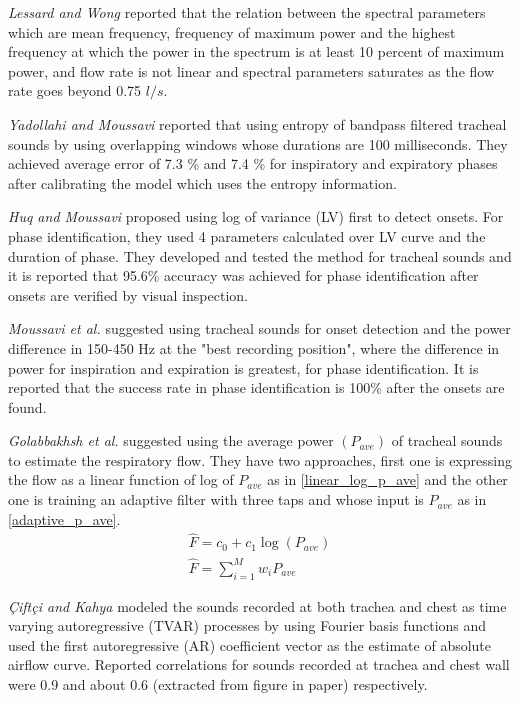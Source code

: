 \textit{Lessard and Wong} \cite{corr-cons-flow-spectrum} reported that the relation between the spectral parameters which are mean frequency, frequency of maximum power and the highest frequency at which the power in the spectrum is at least 10 percent of maximum power, and flow rate is not linear and spectral parameters saturates as the flow rate goes beyond 0.75 $l/s$. \par
\textit{Yadollahi and Moussavi} \cite{entropy-tracheal} reported that using entropy of bandpass filtered tracheal sounds by using overlapping windows whose durations are 100 milliseconds. They achieved average error of 7.3 \% and 7.4 \% for inspiratory and expiratory phases after calibrating the model which uses the entropy information.\par
\textit{Huq and Moussavi} \cite{saiful-moussavi-log-variance} proposed using log of variance (LV) first to detect onsets. For phase identification, they used 4 parameters calculated over LV curve and the duration of phase. They developed and tested the method for tracheal sounds and it is reported that 95.6\% accuracy was achieved for phase identification after onsets are verified by visual inspection.\par
\textit{Moussavi et al.} \cite{computerised-acoustical-phase} suggested using tracheal sounds for onset detection and the power difference in 150-450 Hz at the "best recording position", where the difference in power for inspiration and expiration is greatest, for phase identification. It is reported that the success rate in phase identification is 100\% after the onsets are found.\par
\textit{Golabbakhsh et al.} \cite{flow-trachea-adaptive} suggested using the average power $(P_{ave})$ of tracheal sounds to estimate the respiratory flow. They have two approaches, first one is expressing the flow as a linear function of log of $P_{ave}$ as in \ref{linear_log_p_ave} and the other one is training an adaptive filter with three taps and whose input is $P_{ave}$ as in \ref{adaptive_p_ave}. 
\begin{align}
	\hat{F} = c_0 + c_1 \log(P_{ave}) \label{linear_log_p_ave}\\
	\hat{F} = \sum_{i=1}^{M}w_iP_{ave} \label{adaptive_p_ave}
\end{align} \par
\textit{Çiftçi and Kahya} \cite{koray-ieee-embs} modeled the sounds recorded at both trachea and chest as time varying autoregressive (TVAR) processes by using Fourier basis functions and used the first autoregressive (AR) coefficient vector as the estimate of absolute airflow curve. Reported correlations for sounds recorded at trachea and chest wall were 0.9 and about 0.6 (extracted from figure in paper) respectively. \par
